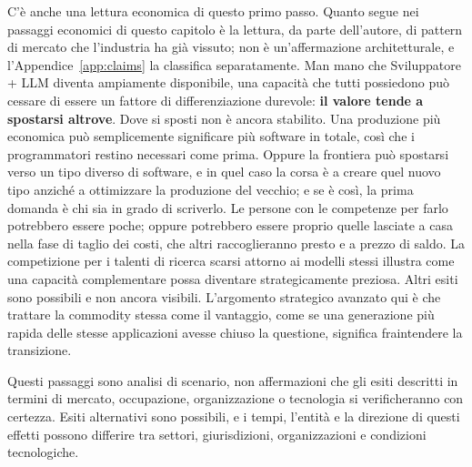 \documentclass[10pt,oneside,openany]{book}
\begin{document}
C'è anche una lettura economica di questo primo passo. Quanto segue nei passaggi economici di questo capitolo è la lettura, da parte dell'autore, di pattern di mercato che l'industria ha già vissuto; non è un'affermazione architetturale, e l'Appendice~\ref{app:claims} la classifica separatamente. Man mano che Sviluppatore + LLM diventa ampiamente disponibile, una capacità che tutti possiedono può cessare di essere un fattore di differenziazione durevole: \textbf{il valore tende a spostarsi altrove}. Dove si sposti non è ancora stabilito. Una produzione più economica può semplicemente significare più software in totale, così che i programmatori restino necessari come prima. Oppure la frontiera può spostarsi verso un tipo diverso di software, e in quel caso la corsa è a creare quel nuovo tipo anziché a ottimizzare la produzione del vecchio; e se è così, la prima domanda è chi sia in grado di scriverlo. Le persone con le competenze per farlo potrebbero essere poche; oppure potrebbero essere proprio quelle lasciate a casa nella fase di taglio dei costi, che altri raccoglieranno presto e a prezzo di saldo. La competizione per i talenti di ricerca scarsi attorno ai modelli stessi illustra come una capacità complementare possa diventare strategicamente preziosa. Altri esiti sono possibili e non ancora visibili. L'argomento strategico avanzato qui è che trattare la commodity stessa come il vantaggio, come se una generazione più rapida delle stesse applicazioni avesse chiuso la questione, significa fraintendere la transizione.

Questi passaggi sono analisi di scenario, non affermazioni che gli esiti descritti in termini di mercato, occupazione, organizzazione o tecnologia si verificheranno con certezza. Esiti alternativi sono possibili, e i tempi, l'entità e la direzione di questi effetti possono differire tra settori, giurisdizioni, organizzazioni e condizioni tecnologiche.
\end{document}
